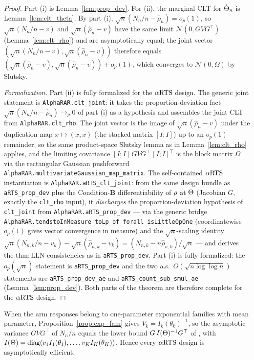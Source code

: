 \begin{proof}\leanok
{}
Part (i) is Lemma~\ref{lem:prop_dev}. For (ii), the marginal CLT for
$\hat{\Theta}_n$ is Lemma~\ref{lem:clt_theta}. By part (i),
$\sqrt n(N_n/n-\hat{\rho}_n)=o_p(1)$, so $\sqrt n(N_n/n-v)$ and
$\sqrt n(\hat{\rho}_n-v)$ have the same limit $\mathcal{N}(0,GVG^\top)$
(Lemma~\ref{lem:clt_rho}) and are asymptotically equal; the joint vector
$(\sqrt n(N_n/n-v),\sqrt n(\hat{\rho}_n-v))$ therefore equals
$(\sqrt n(\hat{\rho}_n-v),\sqrt n(\hat{\rho}_n-v))+o_p(1)$, which converges to
$\mathcal{N}(0,\Omega)$ by Slutsky.

\emph{Formalization.} Part (ii) is fully formalized for the $\alpha\text{RTS}$ design. The generic joint
statement is \texttt{AlphaRAR.clt\_joint}: it takes the proportion-deviation fact
$\sqrt n(N_n/n-\hat{\rho}_n)\to_p 0$ of part (i) as a hypothesis and assembles the joint CLT from
\texttt{AlphaRAR.clt\_rho}. The joint vector is the image of $\sqrt n(\hat{\rho}_n-v)$ under the
duplication map $x\mapsto(x,x)$ (the stacked matrix $[I;I]$) up to an $o_p(1)$ remainder, so the
same product-space Slutsky lemma as in Lemma~\ref{lem:clt_rho} applies, and the limiting covariance
$[I;I]\,GVG^\top\,[I;I]^\top$ is the block matrix $\Omega$ via the rectangular Gaussian pushforward
\texttt{AlphaRAR.multivariateGaussian\_map\_matrix}. The self-contained $\alpha\text{RTS}$ instantiation is
\texttt{AlphaRAR.aRTS\_clt\_joint}: from the same design bundle as \texttt{aRTS\_prop\_dev} plus the
Condition-\textbf{B} differentiability of $\rho$ at $\Theta$ (Jacobian $G$, exactly the
\texttt{clt\_rho} input), it \emph{discharges} the proportion-deviation hypothesis of
\texttt{clt\_joint} from \texttt{AlphaRAR.aRTS\_prop\_dev} --- via the generic bridge
\texttt{AlphaRAR.tendstoInMeasure\_toLp\_of\_forall\_isLittleOpOne} (coordinatewise $o_p(1)$ gives
vector convergence in measure) and the $\sqrt n$-scaling identity
$\sqrt n(N_{n,k}/n-v_k)-\sqrt n(\hat\rho_{n,k}-v_k)=(N_{n,k}-n\hat\rho_{n,k})/\sqrt n$ --- and derives
the $\mathrm{thm{:}LLN}$ consistencies as in \texttt{aRTS\_prop\_dev}. Part (i) is fully formalized:
the $o_p(\sqrt n)$ statement is \texttt{aRTS\_prop\_dev} and the two a.s.\ $O(\sqrt{n\log\log n})$
statements are \texttt{aRTS\_prop\_dev\_ae} and \texttt{aRTS\_count\_sub\_smul\_ae}
(Lemma~\ref{lem:prop_dev}). Both parts of the theorem are therefore complete for the $\alpha\text{RTS}$ design.
\end{proof}

\begin{remark}\label{rem:efficiency}
When the arm responses belong to one-parameter exponential families with mean
parameter, Proposition~\ref{prop:exp_fam} gives $V_k = I_k(\theta_k)^{-1}$, so the
asymptotic variance $GVG^\top$ of $N_n/n$ equals the lower bound
$G\,I(\Theta)^{-1}G^\top$ of \cite{hu2006asymptotically}, with
$I(\Theta)=\mathrm{diag}(v_1 I_1(\theta_1),\dots,v_K I_K(\theta_K))$. Hence every
$\alpha\text{RTS}$ design is asymptotically efficient.
\end{remark}
